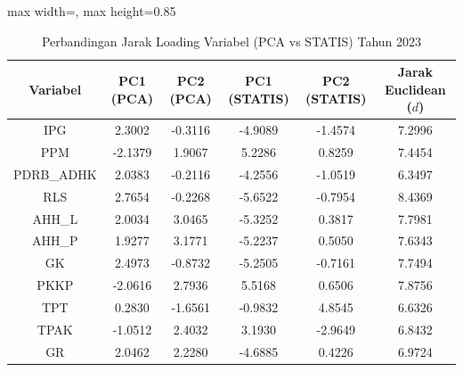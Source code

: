\begin{table}[H]
\centering
\caption{Perbandingan Jarak Loading Variabel (PCA vs STATIS) Tahun 2023} \makeatletter{}\makeatother
\begin{adjustbox}{max width=\textwidth, max height=0.85\textheight}
\begin{tabular}{|c|c|c|c|c|c|}
\hline
\textbf{Variabel} & \textbf{PC1 (PCA)} & \textbf{PC2 (PCA)} & \textbf{PC1 (STATIS)} & \textbf{PC2 (STATIS)} & \textbf{Jarak Euclidean ($d$)} \\
\hline
IPG & 2.3002 & -0.3116 & -4.9089 & -1.4574 & 7.2996 \\
PPM & -2.1379 & 1.9067 & 5.2286 & 0.8259 & 7.4454 \\
PDRB\_ADHK & 2.0383 & -0.2116 & -4.2556 & -1.0519 & 6.3497 \\
RLS & 2.7654 & -0.2268 & -5.6522 & -0.7954 & 8.4369 \\
AHH\_L & 2.0034 & 3.0465 & -5.3252 & 0.3817 & 7.7981 \\
AHH\_P & 1.9277 & 3.1771 & -5.2237 & 0.5050 & 7.6343 \\
GK & 2.4973 & -0.8732 & -5.2505 & -0.7161 & 7.7494 \\
PKKP & -2.0616 & 2.7936 & 5.5168 & 0.6506 & 7.8756 \\
TPT & 0.2830 & -1.6561 & -0.9832 & 4.8545 & 6.6326 \\
TPAK & -1.0512 & 2.4032 & 3.1930 & -2.9649 & 6.8432 \\
GR & 2.0462 & 2.2280 & -4.6885 & 0.4226 & 6.9724 \\
\hline
\end{tabular}
\end{adjustbox}
\end{table}